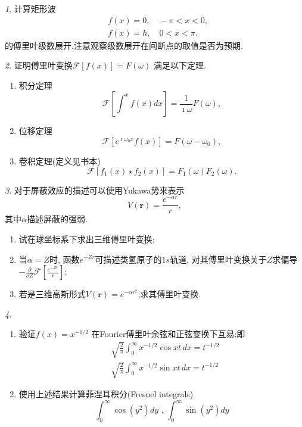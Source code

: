\documentclass[11pt]{article}
\theoremstyle{remark}
\newtheorem{problem}{}
\begin{document}
\renewcommand{\labelenumi}{(\arabic{enumi})}
\renewcommand{\labelenumii}{(\arabic{enumi}.\arabic{enumii})}



\begin{problem}
计算矩形波$$
\begin{aligned}
& f(x)=0, \quad-\pi<x<0, \\
& f(x)=h, \quad 0<x<\pi .
\end{aligned}
$$
的傅里叶级数展开.注意观察级数展开在间断点的取值是否为预期.
\end{problem}
  
\begin{problem}
    证明傅里叶变换$\mathcal{F}[f(x)] = F(\omega)$ 满足以下定理.
    \begin{enumerate}
      
        \item 积分定理
        $$
            \mathcal{F} [ \int^{x} f(x) dx ] = \frac{1}{\imath \omega} F(\omega),
        $$
        \item 位移定理
        $$
            \mathcal{F} [ e^{\imath \omega_0 x} f(x) ] = F(\omega - \omega_0),
        $$
        \item 卷积定理(定义见书本)
        $$
            \mathcal{F} [f_1(x)\star f_2(x) ] = F_1(\omega) F_2(\omega).
        $$
      \end{enumerate}
\end{problem}

\begin{problem}
    对于屏蔽效应的描述可以使用Yukawa势来表示
$$
V(\mathbf{r}) = \frac{e^{-\alpha r}}{r},
$$
其中$\alpha$描述屏蔽的强弱.
\begin{enumerate}
  \item 试在球坐标系下求出三维傅里叶变换;
  \item 当$\alpha=Z$时, 函数$e^{-Zr}$可描述类氢原子的$1s$轨道, 对其傅里叶变换关于$Z$求偏导
  $-\frac{\partial}{\partial Z} \mathcal{F} \left[ \frac{e^{-Z r}}{r}\right]$;
  \item 若是三维高斯形式$V(\mathbf{r}) = e^{-\alpha r^2}$,求其傅里叶变换.
\end{enumerate}
\end{problem}
  
  
\begin{problem}
    \begin{enumerate}
        \item 验证$f(x)=x^{-1 / 2}$ 在Fourier傅里叶余弦和正弦变换下互易;即
        $$
        \begin{aligned}
        & \sqrt{\frac{2}{\pi}} \int_0^{\infty} x^{-1 / 2} \cos {x t} \, dx=t^{-1 / 2} \\
        & \sqrt{\frac{2}{\pi}} \int_0^{\infty} x^{-1 / 2} \sin {x t} \, dx=t^{-1 / 2}
        \end{aligned}
        $$
        \item 使用上述结果计算菲涅耳积分(Fresnel integrals)
        $$
        \int_0^{\infty} \cos \left(y^2\right) d y \text { , } \int_0^{\infty} \sin \left(y^2\right) d y
        $$
      \end{enumerate}
\end{problem}
    
\end{document}
